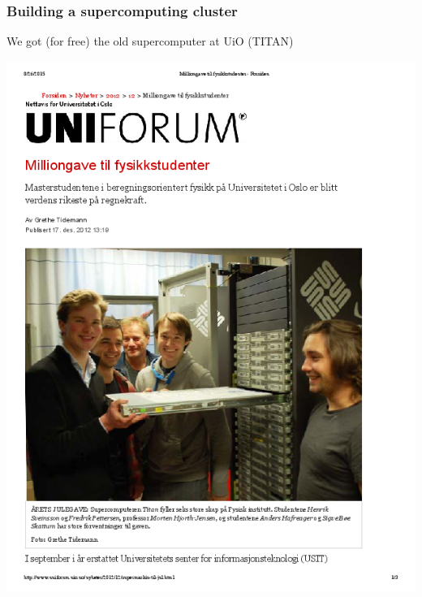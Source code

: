 \documentclass{beamer}
\begin{document}
\begin{frame}
\frametitle{Building a supercomputing cluster}

\begin{block}{We got (for free) the old supercomputer at UiO (TITAN) }


\centerline{\includegraphics[width=0.7\linewidth]{fig-future/uniforum-0.png}}



\end{block}
\end{frame}
\end{document}
